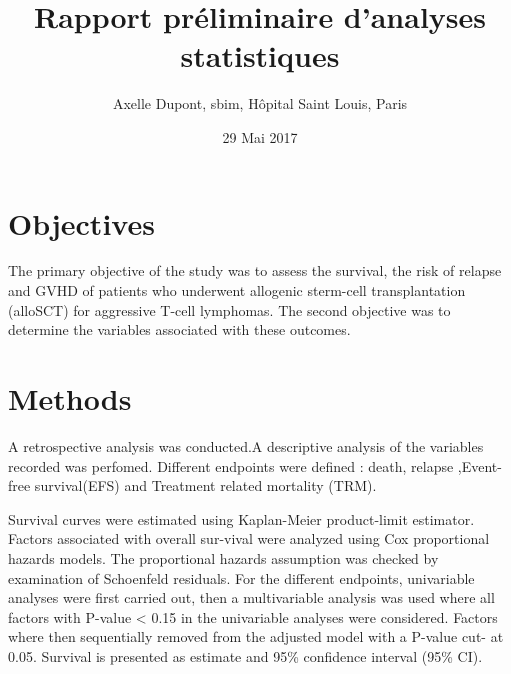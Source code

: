 \documentclass[a4paper,11pt] {article}
\begin{document}
\title{Rapport préliminaire d'analyses statistiques}
\author{Axelle Dupont, sbim, Hôpital Saint Louis, Paris}
\date{29 Mai 2017}















\maketitle

\tableofcontents
\pagebreak[4]
\listoftables
\listoffigures


\pagebreak[4]

\section{Objectives}

The primary objective of the study was to assess the survival, the risk of relapse and GVHD  of patients who underwent allogenic sterm-cell transplantation (alloSCT) for aggressive T-cell lymphomas. 
The second objective was to determine the variables associated with these outcomes.

\section{Methods}

A  retrospective analysis was conducted.A descriptive analysis of the variables recorded was perfomed. Different endpoints were defined : death, relapse ,Event-free survival(EFS) and Treatment related mortality (TRM).

Survival curves were estimated using Kaplan-Meier product-limit estimator. Factors associated with overall sur-vival were analyzed using Cox proportional hazards models. The proportional hazards assumption was checked by examination of Schoenfeld residuals.
For the different endpoints, univariable analyses were first carried out, then a multivariable analysis was used where all factors with P-value < 0.15 in the univariable analyses were considered. Factors where then sequentially removed from the adjusted model with a P-value cut- at 0.05. 
Survival is presented as estimate and 95\% confidence interval (95\% CI).
\end{document}
